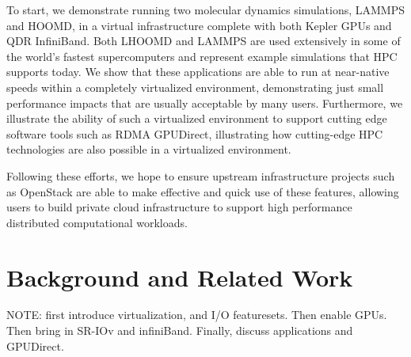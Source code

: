 \documentclass{sigplanconf}
\begin{document}
To start, we demonstrate running two molecular dynamics simulations, LAMMPS and HOOMD, in a virtual infrastructure complete with both Kepler GPUs and QDR InfiniBand.  Both LHOOMD and LAMMPS are used extensively in some of the world's fastest supercomputers and represent example simulations that HPC supports today.  We show that these applications are able to run at near-native speeds within a completely virtualized environment, demonstrating just small performance impacts that are usually acceptable by many users. Furthermore, we illustrate the ability of such a virtualized environment to support cutting edge software tools such as RDMA GPUDirect, illustrating how cutting-edge HPC technologies are also possible in a virtualized environment. 

Following these efforts, we hope to ensure upstream infrastructure projects such as OpenStack \cite{www-openstack, pepple2011deploying} are able to make effective and quick use of these features, allowing users to build private cloud infrastructure to support high performance distributed computational workloads. 





 


\section{Background and Related Work}

NOTE: first introduce virtualization, and I/O featuresets. Then enable GPUs. Then bring in SR-IOv and infiniBand. Finally, discuss applications and GPUDirect.
\end{document}
